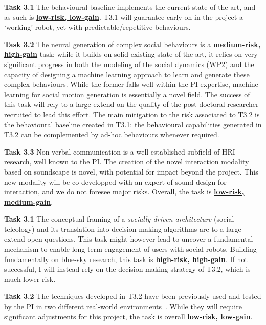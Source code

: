 \begin{rewrite}
\vspace{1em}

\textbf{Task 3.1} The behavioural baseline implements the current state-of-the-art,
and as such is \ul{\bf low-risk, low-gain}. T3.1 will guarantee early on in the
project a `working' robot, yet with predictable/repetitive behaviours.

\textbf{Task 3.2} The neural generation of complex social behaviours is a
\ul{\bf medium-risk, high-gain} task: while it builds on solid existing
state-of-the-art, it relies on very significant progress in both the modeling of the
social dynamics (WP2) and the capacity of designing a machine learning approach
to learn and generate these complex behaviours. While the former falls well
within the PI expertise, machine learning for social motion generation is
essentially a novel field. The success of this task will rely to a large
extend on the quality of the post-doctoral researcher recruited to lead this
effort. The main mitigation to the risk associated to T3.2 is the behavioural
baseline created in T3.1: the behavioural capabilities generated in T3.2 can be
complemented by ad-hoc behaviours whenever required.

\textbf{Task 3.3} Non-verbal communication is a well established subfield of HRI
research, well known to the PI. The creation of the novel interaction modality
based on soundscape is novel, with potential for impact beyond the project. This
new modality will be co-developped with an expert of sound design for
interaction, and we do not foresee major risks. Overall, the task is \ul{\bf
low-risk, medium-gain}.

\vspace{1em}

\textbf{Task 3.1} The conceptual framing of a \emph{socially-driven
architecture} (social teleology) and its translation into decision-making
algorithms are to a large extend open questions. This task might however lead to
uncover a fundamental mechanism to enable long-term engagement of users
with social robots. Building fundamentally on blue-sky research, this task is
\ul{\bf high-risk, high-gain}. If not successful, I will instead rely on the
decision-making strategy of T3.2, which is much lower risk.

\textbf{Task 3.2} The techniques developed in T3.2 have been previously used and
tested by the PI in two different real-world
environments~\cite{senft2019teaching,winkle2020couch}. While they will require
significant adjustments for this project, the task is overall \ul{\bf low-risk,
low-gain}.


\end{rewrite}
